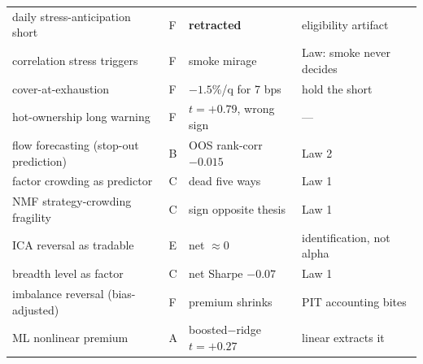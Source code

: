 \begin{table}[t]
\begin{tabular}{llll}
daily stress-anticipation short & F & \textbf{retracted} & eligibility artifact \\
correlation stress triggers & F & smoke mirage & Law: smoke never decides \\
cover-at-exhaustion & F & $-1.5\%$/q for 7 bps & hold the short \\
hot-ownership long warning & F & $t=+0.79$, wrong sign & --- \\
flow forecasting (stop-out prediction) & B & OOS rank-corr $-0.015$ & Law 2 \\
factor crowding as predictor & C & dead five ways & Law 1 \\
NMF strategy-crowding fragility & C & sign opposite thesis & Law 1 \\
ICA reversal as tradable & E & net $\approx 0$ & identification, not alpha \\
breadth level as factor & C & net Sharpe $-0.07$ & Law 1 \\
imbalance reversal (bias-adjusted) & F & premium shrinks & PIT accounting bites \\
ML nonlinear premium & A & boosted$-$ridge $t=+0.27$ & linear extracts it \\
\bottomrule
\end{tabular}
\end{table}
